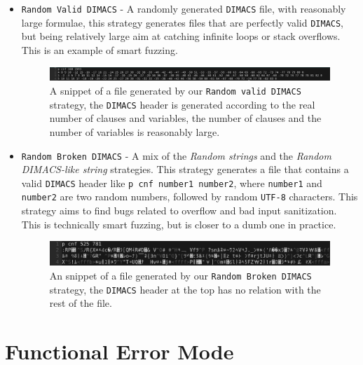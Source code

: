 \documentclass{article}
\begin{document}
\begin{itemize}
		\item \verb|Random Valid DIMACS| - A randomly generated \texttt{DIMACS} file, with reasonably large formulae, this strategy generates files that are perfectly valid \texttt{DIMACS}, but being relatively large aim at catching infinite loops or stack overflows.
		This is an example of smart fuzzing.
		\begin{figure}[H]
			\centering
			\includegraphics[width=0.8\linewidth]{"random valid dimacs"}
			\caption{A snippet of a file generated by our \texttt{Random valid DIMACS} strategy, the \texttt{DIMACS} header is generated according to the real number of clauses and variables, the number of clauses and the number of variables is reasonably large.}
			\label{fig:random-dimacs}
		\end{figure}
	
		\item \verb|Random Broken DIMACS| - A mix of the \emph{Random strings} and the \emph{Random DIMACS-like string} strategies.
		This strategy generates a file that contains a valid \texttt{DIMACS} header like \texttt{p cnf number1 number2}, where \texttt{number1} and \texttt{number2} are two random numbers, followed by random \texttt{UTF-8} characters.
		This strategy aims to find bugs related to overflow and bad input sanitization. 
		This is technically smart fuzzing, but is closer to a dumb one in practice.
		\begin{figure}[H]
			\centering
			\includegraphics[width=0.8\linewidth]{"random broken dimacs"}
			\caption{An snippet of a file generated by our \texttt{Random Broken DIMACS} strategy, the \texttt{DIMACS} header at the top has no relation with the rest of the file.}
			\label{fig:random-broken-dimacs}
		\end{figure}

\end{itemize}








\section{Functional Error Mode}
\end{document}
